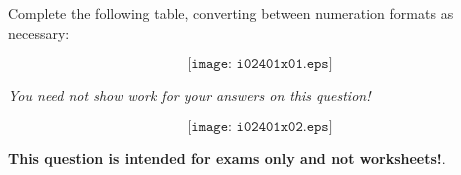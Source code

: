 

Complete the following table, converting between numeration formats as necessary:

$$\texttt{[image: i02401x01.eps]}$$

{\it You need not show work for your answers on this question!}







$$\texttt{[image: i02401x02.eps]}$$







{\bf This question is intended for exams only and not worksheets!}.




